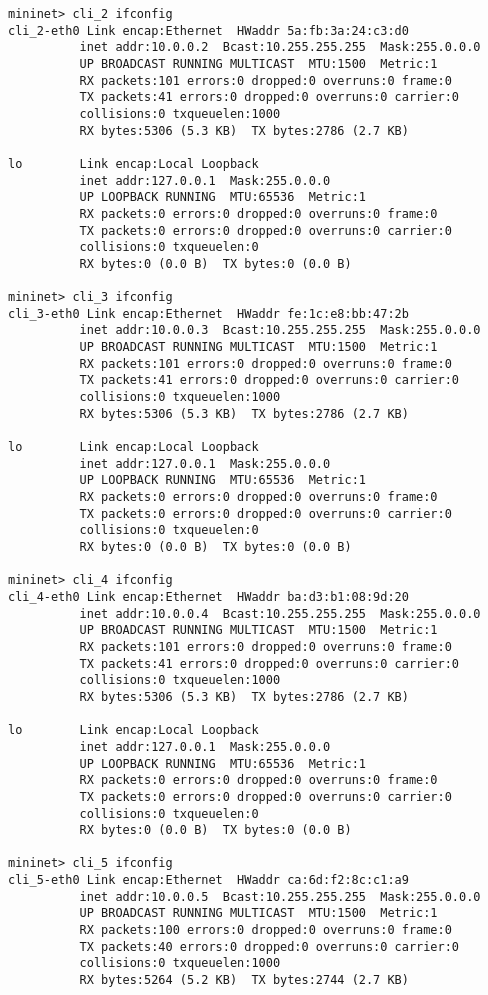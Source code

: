 \documentclass{article}
\begin{document}
\begin{Verbatim}
mininet> cli_2 ifconfig
cli_2-eth0 Link encap:Ethernet  HWaddr 5a:fb:3a:24:c3:d0
          inet addr:10.0.0.2  Bcast:10.255.255.255  Mask:255.0.0.0
          UP BROADCAST RUNNING MULTICAST  MTU:1500  Metric:1
          RX packets:101 errors:0 dropped:0 overruns:0 frame:0
          TX packets:41 errors:0 dropped:0 overruns:0 carrier:0
          collisions:0 txqueuelen:1000
          RX bytes:5306 (5.3 KB)  TX bytes:2786 (2.7 KB)

lo        Link encap:Local Loopback
          inet addr:127.0.0.1  Mask:255.0.0.0
          UP LOOPBACK RUNNING  MTU:65536  Metric:1
          RX packets:0 errors:0 dropped:0 overruns:0 frame:0
          TX packets:0 errors:0 dropped:0 overruns:0 carrier:0
          collisions:0 txqueuelen:0
          RX bytes:0 (0.0 B)  TX bytes:0 (0.0 B)

mininet> cli_3 ifconfig
cli_3-eth0 Link encap:Ethernet  HWaddr fe:1c:e8:bb:47:2b
          inet addr:10.0.0.3  Bcast:10.255.255.255  Mask:255.0.0.0
          UP BROADCAST RUNNING MULTICAST  MTU:1500  Metric:1
          RX packets:101 errors:0 dropped:0 overruns:0 frame:0
          TX packets:41 errors:0 dropped:0 overruns:0 carrier:0
          collisions:0 txqueuelen:1000
          RX bytes:5306 (5.3 KB)  TX bytes:2786 (2.7 KB)

lo        Link encap:Local Loopback
          inet addr:127.0.0.1  Mask:255.0.0.0
          UP LOOPBACK RUNNING  MTU:65536  Metric:1
          RX packets:0 errors:0 dropped:0 overruns:0 frame:0
          TX packets:0 errors:0 dropped:0 overruns:0 carrier:0
          collisions:0 txqueuelen:0
          RX bytes:0 (0.0 B)  TX bytes:0 (0.0 B)

mininet> cli_4 ifconfig
cli_4-eth0 Link encap:Ethernet  HWaddr ba:d3:b1:08:9d:20
          inet addr:10.0.0.4  Bcast:10.255.255.255  Mask:255.0.0.0
          UP BROADCAST RUNNING MULTICAST  MTU:1500  Metric:1
          RX packets:101 errors:0 dropped:0 overruns:0 frame:0
          TX packets:41 errors:0 dropped:0 overruns:0 carrier:0
          collisions:0 txqueuelen:1000
          RX bytes:5306 (5.3 KB)  TX bytes:2786 (2.7 KB)

lo        Link encap:Local Loopback
          inet addr:127.0.0.1  Mask:255.0.0.0
          UP LOOPBACK RUNNING  MTU:65536  Metric:1
          RX packets:0 errors:0 dropped:0 overruns:0 frame:0
          TX packets:0 errors:0 dropped:0 overruns:0 carrier:0
          collisions:0 txqueuelen:0
          RX bytes:0 (0.0 B)  TX bytes:0 (0.0 B)

mininet> cli_5 ifconfig
cli_5-eth0 Link encap:Ethernet  HWaddr ca:6d:f2:8c:c1:a9
          inet addr:10.0.0.5  Bcast:10.255.255.255  Mask:255.0.0.0
          UP BROADCAST RUNNING MULTICAST  MTU:1500  Metric:1
          RX packets:100 errors:0 dropped:0 overruns:0 frame:0
          TX packets:40 errors:0 dropped:0 overruns:0 carrier:0
          collisions:0 txqueuelen:1000
          RX bytes:5264 (5.2 KB)  TX bytes:2744 (2.7 KB)


\end{Verbatim}
\end{document}
